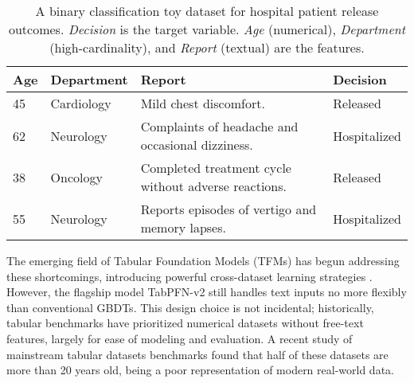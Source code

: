 \documentclass{article}
\begin{document}
\begin{table}[h]
\centering
\caption{A binary classification toy dataset for hospital patient release outcomes. \textit{Decision} is the target variable. \textit{Age} (numerical), \textit{Department} (high-cardinality), and \textit{Report} (textual) are the features.}
\begin{tabular}{llll}
\toprule
\textbf{Age} & \textbf{Department} & \textbf{Report}                                     & \textbf{Decision} \\
\midrule
45          & Cardiology   & Mild chest discomfort.                & Released         \\
62          & Neurology    & Complaints of headache and occasional dizziness.      & Hospitalized     \\
38          & Oncology     & Completed treatment cycle without adverse reactions.  & Released         \\
55          & Neurology    & Reports episodes of vertigo and memory lapses.        & Hospitalized     \\
\bottomrule
\end{tabular}
\label{tab:example_dataset}
\end{table}

The emerging field of Tabular Foundation Models (TFMs) has begun addressing these shortcomings, introducing powerful cross-dataset learning strategies \cite{yan_making_2023, kim_carte_2024, hollmann_accurate_2025}. However, the flagship model TabPFN-v2 \cite{hollmann_accurate_2025} still handles text inputs no more flexibly than conventional GBDTs. This design choice is not incidental; historically, tabular benchmarks have prioritized numerical datasets without free-text features, largely for ease of modeling and evaluation. A recent study \cite{kohli_towards_nodate} of mainstream tabular datasets benchmarks \cite{gijsbers_amlb_2024, fischer_openml-ctr23_2023, ye_closer_2024, mcelfresh_when_2023} found that half of these datasets are more than 20 years old, being a poor representation of modern real-world data.
\end{document}
